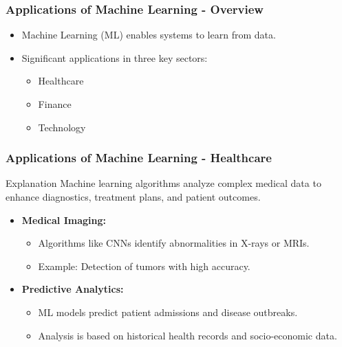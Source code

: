 \documentclass{beamer}
\begin{document}
\begin{frame}[fragile]
    \frametitle{Applications of Machine Learning - Overview}
    \begin{itemize}
        \item Machine Learning (ML) enables systems to learn from data.
        \item Significant applications in three key sectors:
        \begin{itemize}
            \item Healthcare
            \item Finance
            \item Technology
        \end{itemize}
    \end{itemize}
\end{frame}

\begin{frame}[fragile]
    \frametitle{Applications of Machine Learning - Healthcare}
    \begin{block}{Explanation}
        Machine learning algorithms analyze complex medical data to enhance diagnostics, treatment plans, and patient outcomes.
    \end{block}

    \begin{itemize}
        \item \textbf{Medical Imaging:} 
            \begin{itemize}
                \item Algorithms like CNNs identify abnormalities in X-rays or MRIs.
                \item Example: Detection of tumors with high accuracy.
            \end{itemize}
        \item \textbf{Predictive Analytics:}
            \begin{itemize}
                \item ML models predict patient admissions and disease outbreaks.
                \item Analysis is based on historical health records and socio-economic data.
            \end{itemize}
    \end{itemize}
\end{frame}
\end{document}
